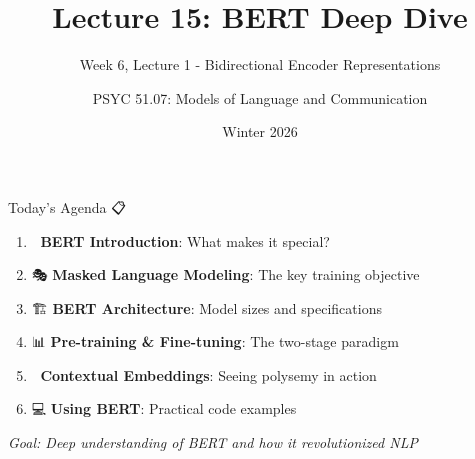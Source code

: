 \documentclass[aspectratio=169]{beamer}
\title{Lecture 15: BERT Deep Dive}
\subtitle{Week 6, Lecture 1 - Bidirectional Encoder Representations}
\author{PSYC 51.07: Models of Language and Communication}
\date{Winter 2026}
\begin{document}
\begin{frame}[shrink=10]
\titlepage
\end{frame}

\begin{frame}[shrink=10]{Today's Agenda 📋}
\large
\begin{enumerate}\setlength{\itemsep}{0pt}
    \item 🎯 \textbf{BERT Introduction}: What makes it special?
    \item 🎭 \textbf{Masked Language Modeling}: The key training objective
    \item 🏗️ \textbf{BERT Architecture}: Model sizes and specifications
    \item 📊 \textbf{Pre-training \& Fine-tuning}: The two-stage paradigm
    \item 🔬 \textbf{Contextual Embeddings}: Seeing polysemy in action
    \item 💻 \textbf{Using BERT}: Practical code examples
\end{enumerate}

\vspace{1em}
\textit{Goal: Deep understanding of BERT and how it revolutionized NLP}
\end{frame}
\end{document}
